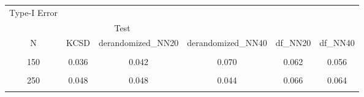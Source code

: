 \begin{table}[!h]
\centering\begingroup\fontsize{5}{7}\selectfont

\begin{tabular}{cccccc}
\toprule
\multicolumn{1}{c}{Type-I Error} \\
\cmidrule(l{3pt}r{3pt}){1-1}
\multicolumn{1}{c}{ } & \multicolumn{2}{c}{Test} \\
\cmidrule(l{3pt}r{3pt}){2-3}
N & KCSD & derandomized_NN20 & derandomized_NN40 & df_NN20 & df_NN40\\
\midrule
\cellcolor{gray!10}{100} & \cellcolor{gray!10}{0.052} & \cellcolor{gray!10}{0.056} & \cellcolor{gray!10}{0.040} & \cellcolor{gray!10}{0.062} & \cellcolor{gray!10}{0.052}\\
150 & 0.036 & 0.042 & 0.070 & 0.062 & 0.056\\
\cellcolor{gray!10}{200} & \cellcolor{gray!10}{0.040} & \cellcolor{gray!10}{0.052} & \cellcolor{gray!10}{0.052} & \cellcolor{gray!10}{0.070} & \cellcolor{gray!10}{0.062}\\
250 & 0.048 & 0.048 & 0.044 & 0.066 & 0.064\\
\cellcolor{gray!10}{50} & \cellcolor{gray!10}{0.038} & \cellcolor{gray!10}{0.054} & \cellcolor{gray!10}{0.060} & \cellcolor{gray!10}{0.048} & \cellcolor{gray!10}{0.062}\\
\bottomrule
\end{tabular}
\endgroup{}
\end{table}
